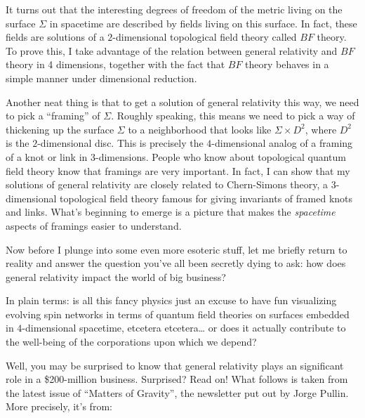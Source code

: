 \documentclass{article}
\def\tightlist{}
\renewcommand{\texttt}[1]{%
  \begingroup
  \ttfamily
  \begingroup\lccode`~=`/\lowercase{\endgroup\def~}{/\discretionary{}{}{}}%
  \begingroup\lccode`~=`[\lowercase{\endgroup\def~}{[\discretionary{}{}{}}%
  \begingroup\lccode`~=`.\lowercase{\endgroup\def~}{.\discretionary{}{}{}}%
  \catcode`/=\active\catcode`[=\active\catcode`.=\active
  \scantokens{#1\noexpand}%
  \endgroup
}
\begin{document}
It turns out that the interesting degrees of freedom of the metric
living on the surface \(\Sigma\) in spacetime are described by fields
living on this surface. In fact, these fields are solutions of a
\(2\)-dimensional topological field theory called \(BF\) theory. To
prove this, I take advantage of the relation between general relativity
and \(BF\) theory in 4 dimensions, together with the fact that \(BF\)
theory behaves in a simple manner under dimensional reduction.

Another neat thing is that to get a solution of general relativity this
way, we need to pick a ``framing'' of \(\Sigma\). Roughly speaking, this
means we need to pick a way of thickening up the surface \(\Sigma\) to a
neighborhood that looks like \(\Sigma\times D^2\), where \(D^2\) is the
\(2\)-dimensional disc. This is precisely the \(4\)-dimensional analog
of a framing of a knot or link in 3-dimensions. People who know about
topological quantum field theory know that framings are very important.
In fact, I can show that my solutions of general relativity are closely
related to Chern-Simons theory, a \(3\)-dimensional topological field
theory famous for giving invariants of framed knots and links. What's
beginning to emerge is a picture that makes the \emph{spacetime} aspects
of framings easier to understand.

Now before I plunge into some even more esoteric stuff, let me briefly
return to reality and answer the question you've all been secretly dying
to ask: how does general relativity impact the world of big business?

In plain terms: is all this fancy physics just an excuse to have fun
visualizing evolving spin networks in terms of quantum field theories on
surfaces embedded in \(4\)-dimensional spacetime, etcetera
etcetera\ldots{} or does it actually contribute to the well-being of the
corporations upon which we depend?

Well, you may be surprised to know that general relativity plays an
significant role in a \$200-million business. Surprised? Read on! What
follows is taken from the latest issue of ``Matters of Gravity'', the
newsletter put out by Jorge Pullin. More precisely, it's from:

\end{document}
